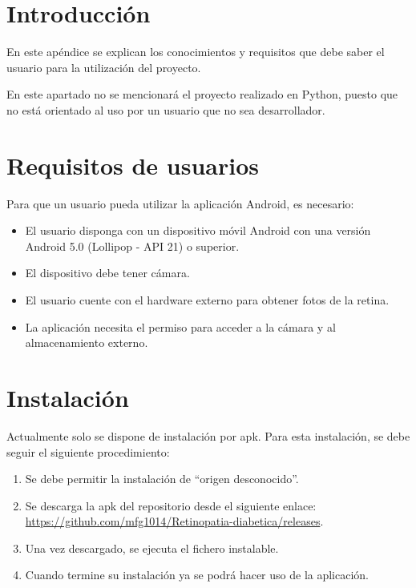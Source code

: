 
\section{Introducción}

En este apéndice se explican los conocimientos y requisitos que debe saber el usuario para la utilización del proyecto.

En este apartado no se mencionará el proyecto realizado en Python, puesto que no está orientado al uso por un usuario que no sea desarrollador.
\section{Requisitos de usuarios}
Para que un usuario pueda utilizar la aplicación Android, es necesario:

\begin{itemize}
    \item El usuario disponga con un dispositivo móvil Android con una versión Android 5.0 (Lollipop - API 21) o superior.
    \item El dispositivo debe tener cámara.
    \item El usuario cuente con el hardware externo para obtener fotos de la retina.
    \item La aplicación necesita el permiso para acceder a la cámara y al almacenamiento externo.
    
\end{itemize}

\section{Instalación}
Actualmente solo se dispone de instalación por apk. Para esta instalación, se debe seguir el siguiente procedimiento:
\begin{enumerate}
    \def\labelenumi{\arabic{enumi}.}
    \tightlist
    \item Se debe permitir la instalación de ``origen desconocido''.
    \item Se descarga la apk del repositorio desde el siguiente enlace:
        \url{https://github.com/mfg1014/Retinopatia-diabetica/releases}.
    \item Una vez descargado, se ejecuta el fichero instalable.
    \item Cuando termine su instalación ya se podrá hacer uso de la aplicación.
    
\end{enumerate}

